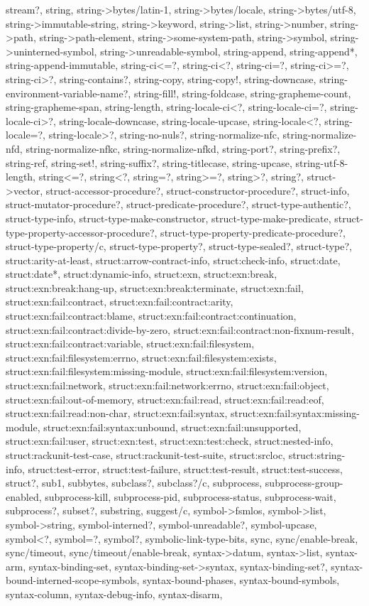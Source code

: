 {{stream?, string, string->bytes/latin-1, string->bytes/locale, string->bytes/utf-8, string->immutable-string, string->keyword, string->list, string->number, string->path, string->path-element, string->some-system-path, string->symbol, string->uninterned-symbol, string->unreadable-symbol, string-append, string-append*, string-append-immutable, string-ci<=?, string-ci<?, string-ci=?, string-ci>=?, string-ci>?, string-contains?, string-copy, string-copy!, string-downcase, string-environment-variable-name?, string-fill!, string-foldcase, string-grapheme-count, string-grapheme-span, string-length, string-locale-ci<?, string-locale-ci=?, string-locale-ci>?, string-locale-downcase, string-locale-upcase, string-locale<?, string-locale=?, string-locale>?, string-no-nuls?, string-normalize-nfc, string-normalize-nfd, string-normalize-nfkc, string-normalize-nfkd, string-port?, string-prefix?, string-ref, string-set!, string-suffix?, string-titlecase, string-upcase, string-utf-8-length, string<=?, string<?, string=?, string>=?, string>?, string?, struct->vector, struct-accessor-procedure?, struct-constructor-procedure?, struct-info, struct-mutator-procedure?, struct-predicate-procedure?, struct-type-authentic?, struct-type-info, struct-type-make-constructor, struct-type-make-predicate, struct-type-property-accessor-procedure?, struct-type-property-predicate-procedure?, struct-type-property/c, struct-type-property?, struct-type-sealed?, struct-type?, struct:arity-at-least, struct:arrow-contract-info, struct:check-info, struct:date, struct:date*, struct:dynamic-info, struct:exn, struct:exn:break, struct:exn:break:hang-up, struct:exn:break:terminate, struct:exn:fail, struct:exn:fail:contract, struct:exn:fail:contract:arity, struct:exn:fail:contract:blame, struct:exn:fail:contract:continuation, struct:exn:fail:contract:divide-by-zero, struct:exn:fail:contract:non-fixnum-result, struct:exn:fail:contract:variable, struct:exn:fail:filesystem, struct:exn:fail:filesystem:errno, struct:exn:fail:filesystem:exists, struct:exn:fail:filesystem:missing-module, struct:exn:fail:filesystem:version, struct:exn:fail:network, struct:exn:fail:network:errno, struct:exn:fail:object, struct:exn:fail:out-of-memory, struct:exn:fail:read, struct:exn:fail:read:eof, struct:exn:fail:read:non-char, struct:exn:fail:syntax, struct:exn:fail:syntax:missing-module, struct:exn:fail:syntax:unbound, struct:exn:fail:unsupported, struct:exn:fail:user, struct:exn:test, struct:exn:test:check, struct:nested-info, struct:rackunit-test-case, struct:rackunit-test-suite, struct:srcloc, struct:string-info, struct:test-error, struct:test-failure, struct:test-result, struct:test-success, struct?, sub1, subbytes, subclass?, subclass?/c, subprocess, subprocess-group-enabled, subprocess-kill, subprocess-pid, subprocess-status, subprocess-wait, subprocess?, subset?, substring, suggest/c, symbol->fsmlos, symbol->list, symbol->string, symbol-interned?, symbol-unreadable?, symbol-upcase, symbol<?, symbol=?, symbol?, symbolic-link-type-bits, sync, sync/enable-break, sync/timeout, sync/timeout/enable-break, syntax->datum, syntax->list, syntax-arm, syntax-binding-set, syntax-binding-set->syntax, syntax-binding-set?, syntax-bound-interned-scope-symbols, syntax-bound-phases, syntax-bound-symbols, syntax-column, syntax-debug-info, syntax-disarm, }}
